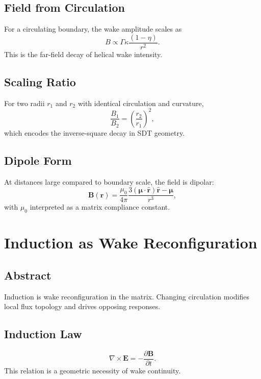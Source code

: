 \documentclass[12pt]{book}
\begin{document}
\section{Field from Circulation}
For a circulating boundary, the wake amplitude scales as
\begin{equation}
B \propto \Gamma \kappa \frac{(1-\eta)}{r^2}.
\end{equation}
This is the far-field decay of helical wake intensity.

\section{Scaling Ratio}
For two radii $r_1$ and $r_2$ with identical circulation and curvature,
\begin{equation}
\frac{B_1}{B_2} = \left(\frac{r_2}{r_1}\right)^2,
\end{equation}
which encodes the inverse-square decay in SDT geometry.

\section{Dipole Form}
At distances large compared to boundary scale, the field is dipolar:
\begin{equation}
\mathbf{B}(\mathbf{r}) = \frac{\mu_0}{4\pi}\frac{3(\boldsymbol{\mu}\cdot \hat{\mathbf{r}})\hat{\mathbf{r}} - \boldsymbol{\mu}}{r^3},
\end{equation}
with $\mu_0$ interpreted as a matrix compliance constant.

\chapter{Induction as Wake Reconfiguration}

\section*{Abstract}
Induction is wake reconfiguration in the matrix. Changing circulation modifies local flux topology and
drives opposing responses.

\section{Induction Law}
\begin{equation}
\nabla \times \mathbf{E} = -\frac{\partial \mathbf{B}}{\partial t}.
\end{equation}
This relation is a geometric necessity of wake continuity.
\end{document}
